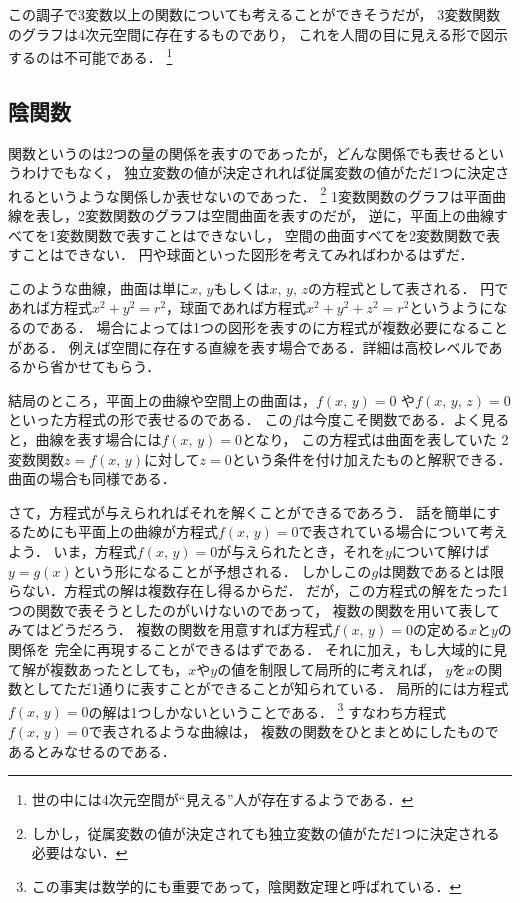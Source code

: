 この調子で3変数以上の関数についても考えることができそうだが，
3変数関数のグラフは4次元空間に存在するものであり，
これを人間の目に見える形で図示するのは不可能である．
\footnote{世の中には4次元空間が``見える''人が存在するようである．}
\subsection{陰関数}
関数というのは2つの量の関係を表すのであったが，どんな関係でも表せるというわけでもなく，
独立変数の値が決定されれば従属変数の値がただ1つに決定されるというような関係しか表せないのであった．
\footnote{しかし，従属変数の値が決定されても独立変数の値がただ1つに決定される必要はない．}
1変数関数のグラフは平面曲線を表し，2変数関数のグラフは空間曲面を表すのだが，
逆に，平面上の曲線すべてを1変数関数で表すことはできないし，
空間の曲面すべてを2変数関数で表すことはできない．
円や球面といった図形を考えてみればわかるはずだ．

このような曲線，曲面は単に$x, \, y$もしくは$x, \, y, \, z$の方程式として表される．
円であれば方程式$x^2+y^2=r^2$，球面であれば方程式$x^2+y^2+z^2=r^2$というようになるのである．
場合によっては1つの図形を表すのに方程式が複数必要になることがある．
例えば空間に存在する直線を表す場合である．詳細は高校レベルであるから省かせてもらう．

結局のところ，平面上の曲線や空間上の曲面は，$f(x, \, y)=0$
や$f(x, \, y, \, z)=0$といった方程式の形で表せるのである．
この$f$は今度こそ関数である．よく見ると，曲線を表す場合には$f(x, \, y)=0$となり，
この方程式は曲面を表していた
2変数関数$z=f(x, \, y)$に対して$z=0$という条件を付け加えたものと解釈できる．
曲面の場合も同様である．

さて，方程式が与えられればそれを解くことができるであろう．
話を簡単にするためにも平面上の曲線が方程式$f(x, \, y)=0$で表されている場合について考えよう．
いま，方程式$f(x, \, y)=0$が与えられたとき，それを$y$について解けば$y=g(x)$という形になることが予想される．
しかしこの$g$は関数であるとは限らない．方程式の解は複数存在し得るからだ．
だが，この方程式の解をたった1つの関数で表そうとしたのがいけないのであって，
複数の関数を用いて表してみてはどうだろう．
複数の関数を用意すれば方程式$f(x, \, y)=0$の定める$x$と$y$の関係を
完全に再現することができるはずである．
それに加え，もし大域的に見て解が複数あったとしても，$x$や$y$の値を制限して局所的に考えれば，
$y$を$x$の関数としてただ1通りに表すことができることが知られている．
局所的には方程式$f(x, \, y)=0$の解は1つしかないということである．
\footnote{この事実は数学的にも重要であって，陰関数定理と呼ばれている．}
すなわち方程式{$f(x, \, y)=0$}で表されるような曲線は，
複数の関数をひとまとめにしたものであるとみなせるのである．

